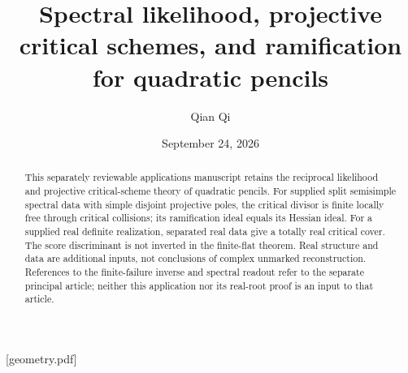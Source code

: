 
[geometry.pdf]
\renewcommand{\thesection}{A\arabic{section}}

\title[Critical schemes of quadratic pencils]{Spectral likelihood, projective critical schemes, and ramification for quadratic pencils}
\author{Qian Qi}
\date{September 24, 2026}
\begin{abstract}
This separately reviewable applications manuscript retains the reciprocal
likelihood and projective critical-scheme theory of quadratic pencils.
For supplied split semisimple spectral data with simple disjoint
projective poles, the critical divisor is finite locally free through
critical collisions; its ramification ideal equals its Hessian ideal.
For a supplied real definite realization, separated real data give a
totally real critical cover.  The score discriminant is not inverted
in the finite-flat theorem.  Real structure and data are additional
inputs, not conclusions of complex unmarked reconstruction.  References
to the finite-failure inverse and spectral readout refer to the separate
principal article; neither this application nor its real-root proof is
an input to that article.
\end{abstract}
\maketitle






